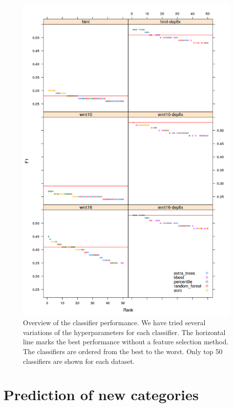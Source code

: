 \begin{figure}
\centering
  \includegraphics[scale=0.7]{wf-sel}
  \caption{
    Overview of the classifier performance.
We have tried several variations of the hyperparameters
for each classifier. The horizontal line marks the best performance without
a feature selection method. The classifiers are ordered from the best to the worst. Only top 50 classifiers
are shown for each dataset.
}
  \label{wf-sel}
\end{figure}



\section{Prediction of new categories}

